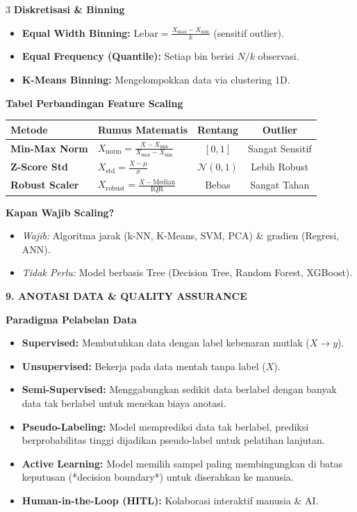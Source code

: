 \documentclass[6.8pt,landscape,a4paper]{extarticle}
\newcommand{\sdtSection}[2][sdtNavy]{%
    \vspace{0.6pt}%
    \noindent\colorbox{#1}{%
        \parbox{\dimexpr\linewidth-2\fboxsep\relax}{%
            \textbf{\fontsize{6.5pt}{7.5pt}\selectfont\color{white}#2}%
        }%
    }\vspace{0.3pt}%
}
\newcommand{\sdtSub}[1]{%
    \vspace{0.5pt}%
    \noindent\textbf{\fontsize{5.8pt}{6.8pt}\selectfont\color{sdtBlue}#1}\vspace{0.1pt}%
}
\begin{document}
\begin{multicols}{3}
\sdtSub{Diskretisasi \& Binning}
\begin{itemize}
    \item \textbf{Equal Width Binning:} $\text{Lebar} = \frac{X_{\max} - X_{\min}}{k}$ (sensitif outlier).
    \item \textbf{Equal Frequency (Quantile):} Setiap bin berisi $N/k$ observasi.
    \item \textbf{K-Means Binning:} Mengelompokkan data via clustering 1D.
\end{itemize}

\sdtSub{Tabel Perbandingan Feature Scaling}
\begin{center}
{\fontsize{4.8pt}{5.8pt}\selectfont
\begin{tabularx}{\linewidth}{@{}lXcc@{}}
\toprule
\textbf{Metode} & \textbf{Rumus Matematis} & \textbf{Rentang} & \textbf{Outlier} \\
\midrule
\textbf{Min-Max Norm} & $X_{\text{norm}} = \frac{X - X_{\min}}{X_{\max} - X_{\min}}$ & $[0, 1]$ & Sangat Sensitif \\
\textbf{Z-Score Std} & $X_{\text{std}} = \frac{X - \mu}{\sigma}$ & $\mathcal{N}(0, 1)$ & Lebih Robust \\
\textbf{Robust Scaler} & $X_{\text{robust}} = \frac{X - \text{Median}}{\text{IQR}}$ & Bebas & Sangat Tahan \\
\bottomrule
\end{tabularx}}
\end{center}
\textbf{Kapan Wajib Scaling?}
\begin{itemize}
    \item \textit{Wajib:} Algoritma jarak (k-NN, K-Means, SVM, PCA) \& gradien (Regresi, ANN).
    \item \textit{Tidak Perlu:} Model berbasis Tree (Decision Tree, Random Forest, XGBoost).
\end{itemize}



\sdtSection{9. ANOTASI DATA \& QUALITY ASSURANCE}

\sdtSub{Paradigma Pelabelan Data}
\begin{itemize}
    \item \textbf{Supervised:} Membutuhkan data dengan label kebenaran mutlak ($X \rightarrow y$).
    \item \textbf{Unsupervised:} Bekerja pada data mentah tanpa label ($X$).
    \item \textbf{Semi-Supervised:} Menggabungkan sedikit data berlabel dengan banyak data tak berlabel untuk menekan biaya anotasi.
    \item \textbf{Pseudo-Labeling:} Model memprediksi data tak berlabel, prediksi berprobabilitas tinggi dijadikan pseudo-label untuk pelatihan lanjutan.
    \item \textbf{Active Learning:} Model memilih sampel paling membingungkan di batas keputusan (*decision boundary*) untuk diserahkan ke manusia.
    \item \textbf{Human-in-the-Loop (HITL):} Kolaborasi interaktif manusia \& AI.
\end{itemize}


\end{multicols}
\end{document}
